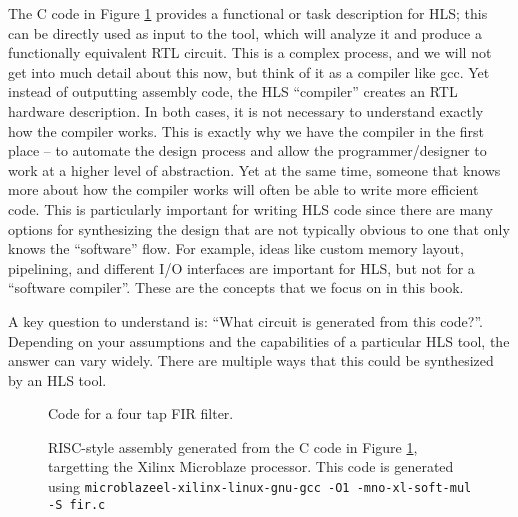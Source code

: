 The C code in Figure \ref{fig:FIR} provides a functional or task description for HLS; this can be directly used as input to the \VHLS tool, which will analyze it and  produce a functionally equivalent RTL circuit. This is a complex process, and we will not get into much detail about this now, but think of it as a compiler like gcc. Yet instead of outputting assembly code, the HLS ``compiler'' creates an RTL hardware description. In both cases, it is not necessary to understand exactly how the compiler works. This is exactly why we have the compiler in the first place -- to automate the design process and allow the programmer/designer to work at a higher level of abstraction. Yet at the same time, someone that knows more about how the compiler works will often be able to write more efficient code. This is particularly important for writing HLS code since there are many options for synthesizing the design that are not typically obvious to one that only knows the ``software'' flow. For example, ideas like custom memory layout, pipelining, and different I/O interfaces are important for HLS, but not for a ``software compiler''. These are the concepts that we focus on in this book.

A key question to understand is: ``What circuit is generated from this code?''.  Depending on your assumptions and the capabilities of a particular HLS tool, the answer can vary widely. There are multiple ways that this could be synthesized by an HLS tool. %

\begin{figure}
{
\begin{scriptsize}

\end{scriptsize}
}
\caption{Code for a four tap FIR filter.
}\label{fig:FIR}
\end{figure}

\begin{figure}
{
\begin{tiny}
\hbox{}

\hbox{}
\end{tiny}
}
\caption{RISC-style assembly generated from the C code in Figure \ref{fig:FIR}, targetting the Xilinx Microblaze processor.  This code is generated using \texttt{microblazeel-xilinx-linux-gnu-gcc -O1 -mno-xl-soft-mul -S fir.c}}\label{fig:FIR_microblaze}
\end{figure}

